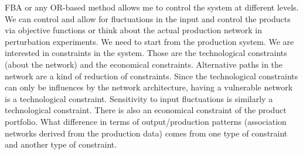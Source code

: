 {FBA or any OR-based method allows me to control the system at different levels. We can control and allow for fluctuations in the input and control the products via objective functions or think about the actual production network in perturbation experiments. We need to start from the production system. We are interested in constraints in the system. Those are the technological constraints (about the network) and the economical constraints.  Alternative paths in the network are a kind of reduction of constraints. Since the technological constraints can only be influences by the network architecture, having a vulnerable network is a technological constraint. Sensitivity to input fluctuations is similarly a technological constraint. There is also an economical constraint of the product portfolio. What difference in terms of output/production patterns (association networks derived from the production data) comes from one type of constraint and another type of constraint.}
